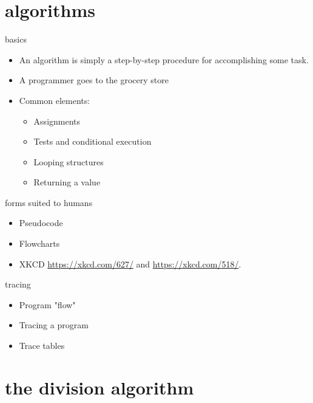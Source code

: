 \documentclass[landscape]{beamer}
\begin{document}
\section{algorithms}

\begin{frame}{basics}
\begin{itemize}
\item An algorithm is simply a step-by-step procedure for accomplishing some task. \pause
\item A programmer goes to the grocery store\textellipsis \pause
\item Common elements:
\begin{itemize}
\item Assignments \pause
\item Tests and conditional execution \pause
\item Looping structures \pause
\item Returning a value
\end{itemize}
\end{itemize}
\end{frame}

\begin{frame}{forms suited to humans}
\begin{itemize}
\item Pseudocode \pause
\item Flowcharts \pause
\item XKCD \href{https://xkcd.com/627/}{https://xkcd.com/627/} and 
\href{https://xkcd.com/518/}{https://xkcd.com/518/}. \pause
\end{itemize}
\end{frame} 

\begin{frame}{tracing}
\begin{itemize}
\item Program "flow"\pause
\item Tracing a program\pause 
\item Trace tables\pause
\end{itemize}
\end{frame}

\section{the division algorithm}
\end{document}
